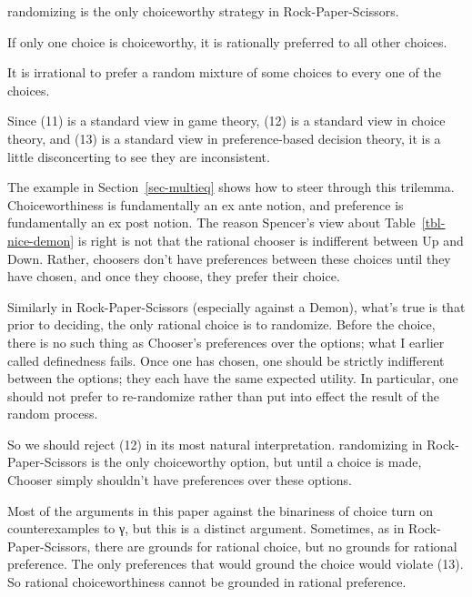 \documentclass[
  10.5pt,
  twoside]{article}
\providecommand{\tightlist}{%
  \setlength{\itemsep}{0pt}\setlength{\parskip}{0pt}}
\let\oldenumerate\enumerate
\let\endoldenumerate\endenumerate
\renewenvironment{enumerate}
  {\vskip 5pt\oldenumerate}
  {\endoldenumerate\vskip 5pt}
\begin{document}
\begin{enumerate}
\def\labelenumi{(\arabic{enumi})}
\setcounter{enumi}{10}
\tightlist
\item
  randomizing is the only choiceworthy strategy in Rock-Paper-Scissors.
\item
  If only one choice is choiceworthy, it is rationally preferred to all
  other choices.
\item
  It is irrational to prefer a random mixture of some choices to every
  one of the choices.
\end{enumerate}

Since (11) is a standard view in game theory, (12) is a standard view in
choice theory, and (13) is a standard view in preference-based decision
theory, it is a little disconcerting to see they are inconsistent.

The example in Section~\ref{sec-multieq} shows how to steer through this
trilemma. Choiceworthiness is fundamentally an ex ante notion, and
preference is fundamentally an ex post notion. The reason Spencer's view
about Table~\ref{tbl-nice-demon} is right is not that the rational
chooser is indifferent between Up and Down. Rather, choosers don't have
preferences between these choices until they have chosen, and once they
choose, they prefer their choice.

Similarly in Rock-Paper-Scissors (especially against a Demon), what's
true is that prior to deciding, the only rational choice is to
randomize. Before the choice, there is no such thing as Chooser's
preferences over the options; what I earlier called definedness fails.
Once one has chosen, one should be strictly indifferent between the
options; they each have the same expected utility. In particular, one
should not prefer to re-randomize rather than put into effect the result
of the random process.

So we should reject (12) in its most natural interpretation. randomizing
in Rock-Paper-Scissors is the only choiceworthy option, but until a
choice is made, Chooser simply shouldn't have preferences over these
options.

Most of the arguments in this paper against the binariness of choice
turn on counterexamples to γ, but this is a distinct argument.
Sometimes, as in Rock-Paper-Scissors, there are grounds for rational
choice, but no grounds for rational preference. The only preferences
that would ground the choice would violate (13). So rational
choiceworthiness cannot be grounded in rational preference.
\end{document}
